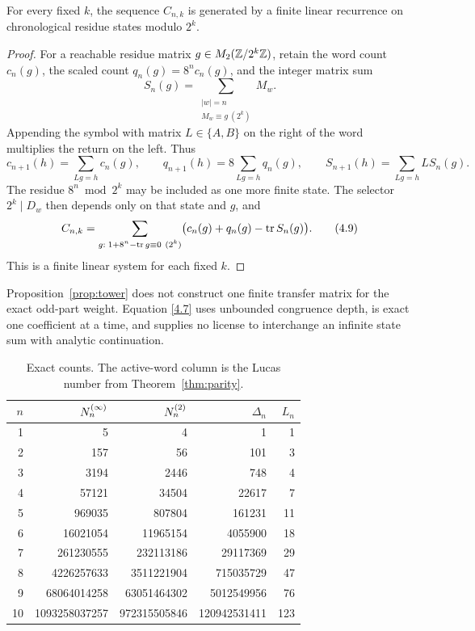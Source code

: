 \begin{proposition}
\label{prop:tower}
For every fixed \(k\), the sequence \(C_{n,k}\) is generated by a finite
linear recurrence on chronological residue states modulo \(2^k\).
\end{proposition}

\begin{proof}
For a reachable residue matrix \(g\in M_2(\mathbb{Z}/2^k\mathbb{Z})\), retain the word
count \(c_n(g)\), the scaled count \(q_n(g)=8^n c_n(g)\), and the integer
matrix sum
\[
 S_n(g)=\sum_{\substack{|w|=n\\M_w\equiv g\ (2^k)}}M_w.
\]
Appending the symbol with matrix \(L\in\{A,B\}\) on the right of the word
multiplies the return on the left.  Thus
\[
 c_{n+1}(h)=\sum_{Lg=h}c_n(g),\qquad
 q_{n+1}(h)=8\sum_{Lg=h}q_n(g),\qquad
 S_{n+1}(h)=\sum_{Lg=h}L S_n(g).
 \tag{4.8}\label{4.8}
\]
The residue \(8^n\bmod2^k\) may be included as one more finite state.  The
selector \(2^k\mid D_w\) then depends only on that state and \(g\), and
\[
 C_{n,k}=\sum_{\substack{g:\;1+8^n-\operatorname{tr} g\equiv0\ (2^k)}}
 \bigl(c_n(g)+q_n(g)-\operatorname{tr} S_n(g)\bigr).
 \tag{4.9}\label{4.9}
\]
This is a finite linear system for each fixed \(k\).
\end{proof}

Proposition~\ref{prop:tower} does not construct one finite transfer matrix
for the exact odd-part weight.  Equation \eqref{4.7} uses unbounded congruence
depth, is exact one coefficient at a time, and supplies no license to
interchange an infinite state sum with analytic continuation.

\begin{table}[t]
\centering
\small
\caption{Exact counts.  The active-word column is the Lucas number from
Theorem~\ref{thm:parity}.}
\label{tab:counts}
\begin{tabular}{r@{\quad}r@{\quad}r@{\quad}r@{\quad}r}
\toprule
\(n\)&\(N^{(\infty)}_n\)&\(N^{(2)}_n\)&\(\Delta_n\)&\(L_n\)\\
\midrule
1&5&4&1&1\\
2&157&56&101&3\\
3&3194&2446&748&4\\
4&57121&34504&22617&7\\
5&969035&807804&161231&11\\
6&16021054&11965154&4055900&18\\
7&261230555&232113186&29117369&29\\
8&4226257633&3511221904&715035729&47\\
9&68064014258&63051464302&5012549956&76\\
10&1093258037257&972315505846&120942531411&123\\
\bottomrule
\end{tabular}
\end{table}
